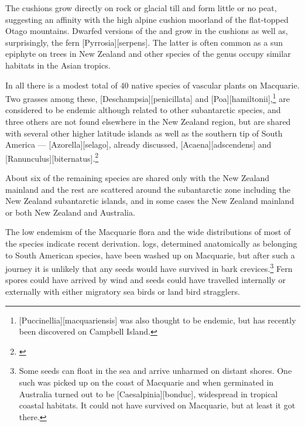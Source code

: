The cushions grow directly on rock or glacial till and form little or no peat, suggesting an affinity with the high alpine cushion moorland of the flat-topped Otago mountains.
Dwarfed versions of the  and  grow in the cushions as well as, surprisingly, the fern [Pyrrosia][serpens].
The latter is often common as a sun epiphyte on trees in New Zealand and other species of the genus occupy similar habitats in the Asian tropics.

In all there is a modest total of 40 native species of vascular plants on Macquarie.
Two grasses among these, [Deschampsia][penicillata] and [Poa][hamiltonii],\footnote{[Puccinellia][macquariensis] was also thought to be endemic, but has recently been discovered on Campbell Island.} are considered to be endemic although related to other subantarctic species, and three others are not found elsewhere in the New Zealand region, but are shared with several other higher latitude islands as well as the southern tip of South America --- [Azorella][selago], already discussed, [Acaena][adscendens] and [Ranunculus][biternatus].\footnote{\cite{wace1960botany}}

About six of the remaining species are shared only with the New Zealand mainland and the rest are scattered around the subantarctic zone including the New Zealand subantarctic islands, and in some cases the New Zealand mainland or both New Zealand and Australia.

The low endemism of the Macquarie flora and the wide distributions of most of the species indicate recent derivation.  logs, determined anatomically as belonging to South American species, have been washed up on Macquarie, but after such a journey it is unlikely that any seeds would have survived in bark crevices.\footnote{Some seeds can float in the sea and arrive unharmed on distant shores. One such was picked up on the coast of Macquarie and when germinated in Australia turned out to be [Caesalpinia][bonduc], widespread in tropical coastal habitats. It could not have survived on Macquarie, but at least it got there.}
Fern spores could have arrived by wind and seeds could have travelled internally or externally with either migratory sea birds or land bird stragglers.

